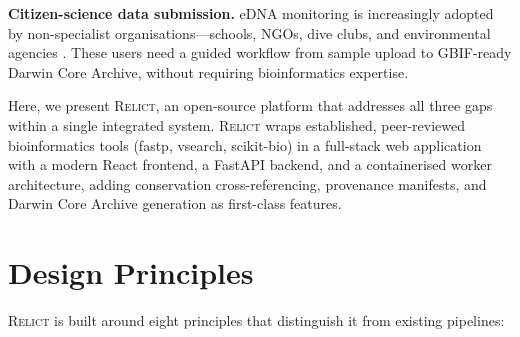 \documentclass[11pt, a4paper]{article}
\newcommand{\relict}{\textsc{Relict}}
\begin{document}
\textbf{Citizen-science data submission.} eDNA monitoring is
increasingly adopted by non-specialist organisations---schools, NGOs,
dive clubs, and environmental agencies \citep{Larson2020}. These users
need a guided workflow from sample upload to GBIF-ready Darwin Core
Archive, without requiring bioinformatics expertise.

Here, we present \relict, an open-source platform that addresses all
three gaps within a single integrated system. \relict{} wraps
established, peer-reviewed bioinformatics tools (fastp, vsearch,
scikit-bio) in a full-stack web application with a modern React
frontend, a FastAPI backend, and a containerised worker architecture,
adding conservation cross-referencing, provenance manifests, and
Darwin Core Archive generation as first-class features.


\section{Design Principles}

\relict{} is built around eight principles that distinguish it from
existing pipelines:
\end{document}
